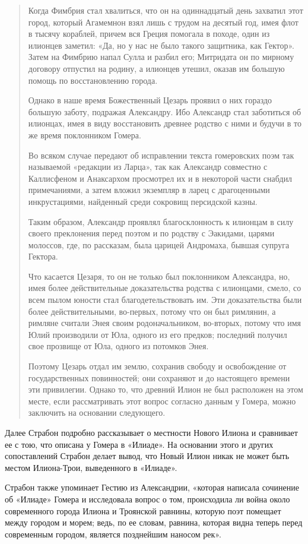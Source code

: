 \begin{quotation}
Когда Фимбрия стал хвалиться, что он на одиннадцатый день захватил этот город, который Агамемнон взял лишь с трудом на десятый год, имея флот в тысячу кораблей, причем вся Греция помогала в походе, один из илионцев заметил: «Да, но у нас не было такого защитника, как Гектор». Затем на Фимбрию напал Сулла и разбил его; Митридата он по мирному договору отпустил на родину, а илионцев утешил, оказав им большую помощь по восстановлению города.

Однако в наше время Божественный Цезарь проявил о них гораздо большую заботу, подражая Александру. Ибо Александр стал заботиться об илионцах, имея в виду восстановить древнее родство с ними и будучи в то же время поклонником Гомера. 

Во всяком случае передают об исправлении текста гомеровских поэм так называемой «редакции из Ларца», так как Александр совместно с Каллисфеном и Анаксархом просмотрел их и в некоторой части снабдил примечаниями, а затем вложил экземпляр в ларец с драгоценными инкрустациями, найденный среди сокровищ персидской казны. 

Таким образом, Александр проявлял благосклонность к илионцам в силу своего преклонения перед поэтом и по родству с Эакидами, царями молоссов, где, по рассказам, была царицей Андромаха, бывшая супруга Гектора. 

Что касается Цезаря, то он не только был поклонником Александра, но, имея более действительные доказательства родства с илионцами, смело, со всем пылом юности стал благодетельствовать им. Эти доказательства были более действительными, во-первых, потому что он был римлянин, а римляне считали Энея своим родоначальником, во-вторых, потому что имя Юлий производили от Юла, одного из его предков; последний получил свое прозвище от Юла, одного из потомков Энея. 

Поэтому Цезарь отдал им землю, сохранив свободу и освобождение от государственных повинностей; они сохраняют и до настоящего времени эти привилегии. Однако то, что древний Илион не был расположен на этом месте, если рассматривать этот вопрос согласно данным у Гомера, можно заключить на основании следующего.
\end{quotation}

Далее Страбон подробно рассказывает о местности Нового Илиона и сравнивает ее с тою, что описана у Гомера в «Илиаде». На основании этого и других сопоставлений Страбон делает вывод, что Новый Илион никак не может быть местом Илиона-Трои, выведенного в «Илиаде». 

Страбон также упоминает Гестию из Александрии, «которая написала сочинение об «Илиаде» Гомера и исследовала вопрос о том, происходила ли война около современного города Илиона и Троянской равнины, которую поэт помещает между городом и морем; ведь, по ее словам, равнина, которая видна теперь перед современным городом, является позднейшим наносом рек».

